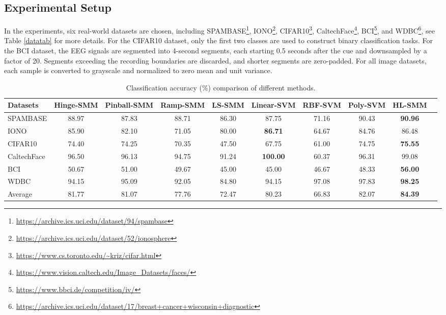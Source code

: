 \documentclass[sn-mathphys]{JORSC-jnl}%
\theoremstyle{thmstyleone}%
\theoremstyle{thmstylethree}%
\theoremstyle{thmstyleone} %
\begin{document}
\subsection{Experimental Setup}






In the experiments, six real-world datasets are chosen, including 
SPAMBASE\footnote{\url{https://archive.ics.uci.edu/dataset/94/spambase}}, 
IONO\footnote{\url{https://archive.ics.uci.edu/dataset/52/ionosphere}}, 
CIFAR10\footnote{\url{https://www.cs.toronto.edu/~kriz/cifar.html}}, 
CaltechFace\footnote{\url{https://www.vision.caltech.edu/Image_Datasets/faces/}},
BCI\footnote{\url{https://www.bbci.de/competition/iv/}}, 
and
WDBC\footnote{\url{https://archive.ics.uci.edu/dataset/17/breast+cancer+wisconsin+diagnostic}},
see Table  \ref{datatab} for more details.
For the CIFAR10 dataset, only the first two classes are used to construct binary classification tasks. 
For the BCI dataset, the EEG signals are segmented into 4-second segments, each starting 0.5 seconds after the cue and downsampled by a factor of 20. Segments exceeding the recording boundaries are discarded, and shorter segments are zero-padded. 
For all image datasets, each sample is converted to grayscale and normalized to zero mean and unit variance. 



\begin{table}[t]
\caption{Classification accuracy (\%) comparison of different methods.}
\label{table1}
\centering
\setlength{\tabcolsep}{4pt} 
\renewcommand{\arraystretch}{1.12} 
\begin{adjustbox}{width=\textwidth}
\begin{tabular}{lccccccccc}
\toprule 
Datasets 
& Hinge-SMM 
& Pinball-SMM 
& Ramp-SMM 
& LS-SMM 
& Linear-SVM 
& RBF-SVM 
& Poly-SVM
& HL-SMM \\
\midrule  
SPAMBASE 
& 88.97 & 87.83 & 88.71 & 86.30 & 87.75 & 71.16 & 90.43 & \textbf{90.96} \\
IONO 
& 85.90 & 82.10 & 71.05 & 80.00 & \textbf{86.71} & 64.67 & 84.76 & 86.48 \\
CIFAR10 
& 74.40 & 74.25 & 70.35 & 47.50 & 67.75 & 61.00 & 74.75 & \textbf{75.55} \\
CaltechFace
& 96.50 & 96.13 & 94.75 & 91.24 & \textbf{100.00} & 60.37 & 96.31 & 99.08 \\
BCI 
& 50.67 & 51.00 & 49.67 & 45.00 & 45.00 & 46.67 & 48.33 & \textbf{56.00} \\
WDBC 
& 94.15 & 95.09 & 92.05 & 84.80 & 94.15 & 97.08 & 97.83 & \textbf{98.25} \\
\midrule  
Average
& 81.77 & 81.07 & 77.76 & 72.47 & 80.23 & 66.83 & 82.07 & \textbf{84.39} \\
\bottomrule  
\end{tabular}
\end{adjustbox}
\end{table}
\end{document}
